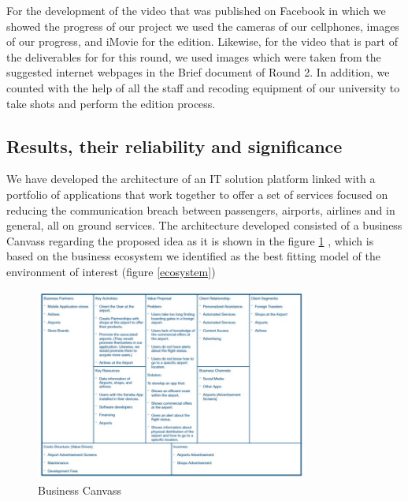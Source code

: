 \documentclass[12pt]{article}
\begin{document}
For the development of the video that was published on Facebook in which we showed the progress of our project we used the cameras of our cellphones, images of our progress, and iMovie for the edition. Likewise, for the video that is part of the deliverables for for this round, we used images which were taken from the suggested internet webpages in the Brief document of Round 2. In addition, we counted with the help of all the staff and recoding equipment of our university to take shots and perform the edition process.\\ 


\subsection{Results, their reliability and significance}

We have developed the architecture of an IT solution platform linked with a portfolio of applications that work together to offer a set of services focused on reducing the communication breach between passengers, airports, airlines and in general, all on ground services. The architecture developed consisted of a business Canvass regarding the proposed idea as it is shown in the figure \ref{canvass} , which is based on the business ecosystem we identified as the best fitting model of the environment of interest (figure \ref{ecosystem})

\begin{figure}[H]
	\centering
	\includegraphics[width=0.8\textwidth]{Canvass.jpg}
	\caption { Business Canvass}
	\label{canvass}
\end{figure}
\end{document}
